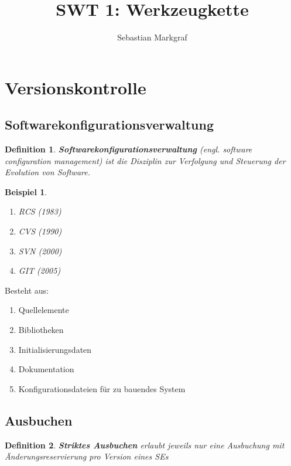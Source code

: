 \documentclass[a4paper]{article}
\title{SWT 1: Werkzeugkette}
\author{Sebastian Markgraf}
\theoremstyle{break}
\newtheorem{defi}{Definition}[section]
\newtheorem{ex}{Beispiel}[section]
\begin{document}
    \maketitle
    \newpage

    \section{Versionskontrolle}
    \subsection{Softwarekonfigurationsverwaltung}
    \begin{defi}
      \textbf{Softwarekonfigurationsverwaltung} (engl. software configuration management) ist die Disziplin zur Verfolgung und Steuerung der Evolution von Software.
    \end{defi}

    \begin{ex}
      \begin {enumerate}
        \item RCS (1983)
        \item CVS (1990)
        \item SVN (2000)
        \item GIT (2005)
      \end {enumerate}
    \end{ex}

    \begin{flushleft}
      Besteht aus:
    \end{flushleft}
    \begin{enumerate}
    \item Quellelemente
    \item Bibliotheken
    \item Initialisierungsdaten
    \item Dokumentation
    \item Konfigurationsdateien für zu bauendes System  
    \end{enumerate}

    \subsection{Ausbuchen}
    \begin {defi}
      \textbf{Striktes Ausbuchen} erlaubt jeweils nur eine Ausbuchung mit Änderungsreservierung pro Version eines SEs
    \end {defi}
\end{document}
